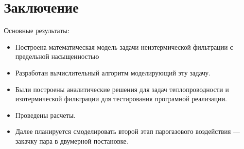 \documentclass[12pt,a4paper]{article}
\begin{document}
\section{Заключение}
Основные результаты:
\begin{itemize}
\item Построена математическая модель задачи неизтермической фильтрации с предельной насыщенностью
\item Разработан вычислительный алгоритм моделирующий эту задачу.
\item Были построены аналитические решения для задач теплопроводности и изотермической фильтрации для тестирования програмной реализации.
\item Проведены расчеты.
\item Далее планируется смоделировать второй этап парогазового воздействия --- закачку пара в двумерной постановке.
\end{itemize}
\newpage
 
 
\end{document}
